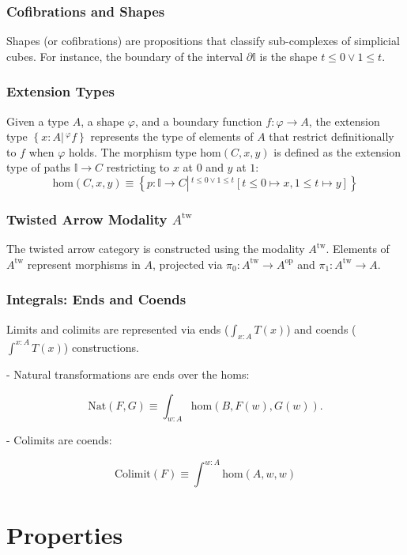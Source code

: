 \documentclass[11pt]{article}
\newcommand{\op}[0]{^\text{op}}
\newcommand{\homtype}[3]{\text{hom}(#1, #2, #3)}
\begin{document}
\subsubsection{Cofibrations and Shapes}
Shapes (or cofibrations) are propositions that classify sub-complexes of simplicial cubes. For instance, the boundary of the interval $\partial \mathbb{I}$ is the shape $t \le 0 \vee 1 \le t$.

\subsubsection{Extension Types}
Given a type $A$, a shape $\varphi$, and a boundary function $f : \varphi \to A$, the extension type $\left\{ x : A \left|\,^\varphi f \right. \right\}$ represents the type of elements of $A$ that restrict definitionally to $f$ when $\varphi$ holds.
The morphism type $\text{hom}(C, x, y)$ is defined as the extension type of paths $\mathbb{I} \to C$ restricting to $x$ at $0$ and $y$ at $1$:
\begin{equation}
    \homtype{C}{x}{y} \equiv \left\{ p : \mathbb{I} \to C \left|\,^{t \le 0 \vee 1 \le t} [t \le 0 \mapsto x, 1 \le t \mapsto y] \right. \right\}
\end{equation}

\subsubsection{Twisted Arrow Modality $A^\text{tw}$}
The twisted arrow category is constructed using the modality $A^\text{tw}$. Elements of $A^\text{tw}$ represent morphisms in $A$, projected via $\pi_0 : A^\text{tw} \to A\op$ and $\pi_1 : A^\text{tw} \to A$.


\subsubsection{Integrals: Ends and Coends}

Limits and colimits are represented via ends ($\int_{x:A} T(x)$) and coends ($\int^{x:A} T(x)$) constructions.

- Natural transformations are ends over the homs:

$$
  \text{Nat}(F, G) \equiv \int_{w:A} \homtype{B}{F(w)}{G(w)}.
$$

- Colimits are coends:

$$
  \text{Colimit}(F) \equiv \int^{w:A} \homtype{A}{w}{w}
$$

\newpage
\section{Properties}
\end{document}

